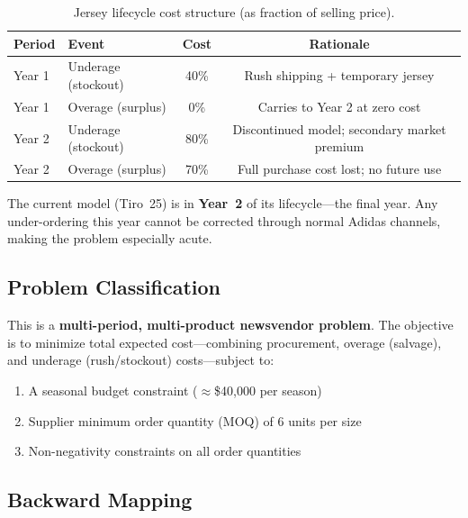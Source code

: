 \documentclass[11pt, letterpaper]{article}
\begin{document}
\begin{table}[H]
\centering
\caption{Jersey lifecycle cost structure (as fraction of selling price).}
\label{tab:lifecycle-costs}
\begin{tabular}{@{}llcc@{}}
\toprule
\textbf{Period} & \textbf{Event} & \textbf{Cost} & \textbf{Rationale} \\
\midrule
Year 1 & Underage (stockout) & 40\% & Rush shipping + temporary jersey \\
Year 1 & Overage (surplus) & 0\% & Carries to Year 2 at zero cost \\
Year 2 & Underage (stockout) & 80\% & Discontinued model; secondary market premium \\
Year 2 & Overage (surplus) & 70\% & Full purchase cost lost; no future use \\
\bottomrule
\end{tabular}
\end{table}

The current model (Tiro~25) is in \textbf{Year~2} of its lifecycle---the final year. Any under-ordering this year cannot be corrected through normal Adidas channels, making the problem especially acute.

\subsection{Problem Classification}

This is a \textbf{multi-period, multi-product newsvendor problem}. The objective is to minimize total expected cost---combining procurement, overage (salvage), and underage (rush/stockout) costs---subject to:
\begin{enumerate}[nosep]
    \item A seasonal budget constraint ($\approx$\$40,000 per season)
    \item Supplier minimum order quantity (MOQ) of 6 units per size
    \item Non-negativity constraints on all order quantities
\end{enumerate}

\subsection{Backward Mapping}
\end{document}
